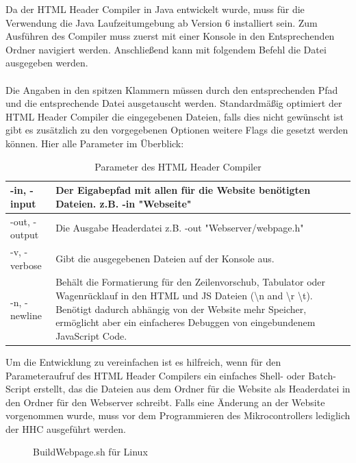 Da der HTML Header Compiler in Java entwickelt wurde, muss für die Verwendung die
Java Laufzeitumgebung ab Version 6 installiert sein. Zum Ausführen des Compiler
muss zuerst mit einer Konsole in den Entsprechenden Ordner navigiert werden.
Anschließend kann mit folgendem Befehl die Datei ausgegeben werden. 
\\

\\

Die Angaben in den spitzen Klammern müssen durch den entsprechenden Pfad und
die entsprechende Datei ausgetauscht werden. Standardmäßig optimiert der
HTML Header Compiler die eingegebenen Dateien, falls dies nicht gewünscht ist
gibt es zusätzlich zu den vorgegebenen Optionen weitere Flags
die gesetzt werden können. Hier alle Parameter im Überblick:

\begin{table}[H]
\begin{tabular}{| p{} | p{} |}
\hline
-in, -input & Der Eigabepfad mit allen für die Website benötigten Dateien. z.B. \textrm{-in "Webseite"} \\ \hline 
-out, -output & Die Ausgabe Headerdatei z.B. \textrm{-out "Webserver/webpage.h"} \\ \hline
-v, -verbose &  Gibt die ausgegebenen Dateien auf der Konsole aus. \\  
 \hline 
 -n, -newline & Behält die Formatierung für den Zeilenvorschub, Tabulator
 oder Wagenrücklauf in den HTML und JS Dateien (\textbackslash n and
 \textbackslash r \textbackslash t).
 Benötigt dadurch abhängig von der Website mehr Speicher, ermöglicht aber ein
 einfacheres Debuggen von eingebundenem JavaScript Code.  \\ \hline
\end{tabular}
\caption{Parameter des HTML Header Compiler}
\label{parameterHHC}
\end{table}

Um die Entwicklung zu vereinfachen ist es hilfreich, wenn für den Parameteraufruf
des HTML Header Compilers ein einfaches Shell- oder Batch-Script erstellt, das
die Dateien aus dem Ordner für die Website als Headerdatei in den Ordner für den
Webserver schreibt. Falls eine Änderung an der Website vorgenommen wurde, muss
vor dem Programmieren des Mikrocontrollers lediglich der \ac{HHC} ausgeführt
werden.

\begin{figure}[H]

\caption{BuildWebpage.sh für Linux}
\label{output}
\end{figure}


